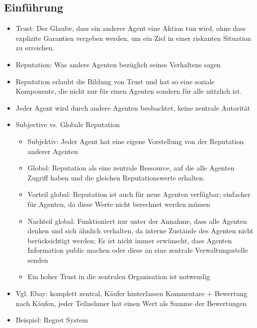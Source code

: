 \documentclass{article} %
\begin{document}
	\subsection{Einführung}
	\begin{itemize}
		\item Trust: Der Glaube, dass ein anderer Agent eine Aktion tun wird, ohne dass explizite Garantien vergeben werden, um ein Ziel in einer riskanten Situation zu erreichen.
		\item Reputation: Was andere Agenten bezüglich seines Verhaltens sagen
		\item Reputation erlaubt die Bildung von Trust und hat so eine soziale Komponente, die nicht nur für einen Agenten sondern für alle nützlich ist.
		\item Jeder Agent wird durch andere Agenten beobachtet, keine zentrale Autorität
		\item Subjective vs. Globale Reputation
		\begin{itemize}
			\item Subjektiv: Jeder Agent hat eine eigene Vorstellung von der Reputation anderer Agenten
			\item Global: Reputation als eine zentrale Ressource, auf die alle Agenten Zugriff haben und die gleichen Reputationswerte erhalten.
			\item Vorteil global: Reputation ist auch für neue Agenten verfügbar; einfacher für Agenten, da diese Werte nicht berechnet werden müssen
			\item Nachteil global: Funktioniert nur unter der Annahme, dass alle Agenten denken und sich ähnlich verhalten, da interne Zustände des Agenten nicht berücksichtigt werden; Es ist nicht immer erwünscht, dass Agenten Information public machen oder diese an eine zentrale Verwaltungsstelle senden
			\item Ein hoher Trust in die zentralen Organisation ist notwendig
		\end{itemize}
		\item Vgl. Ebay: komplett zentral, Käufer hinterlassen Kommentare + Bewertung nach Käufen, jeder Teilnehmer hat einen Wert als Summe der Bewertungen
		\item Beispiel: Regret System
	\end{itemize}
\end{document}
